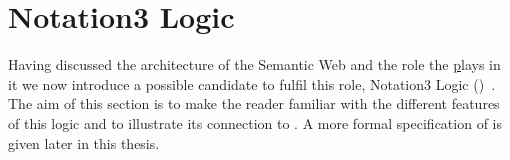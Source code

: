 % 
% 




\section{Notation3 Logic}\label{n3examples}
Having discussed the architecture of the Semantic Web and the role the \ul plays in it we now introduce a possible candidate to fulfil this role, 
Notation3 Logic (\nthreelogic)~\cite{N3Logic}. 
The aim of this section is to make the reader familiar with
the different features of this logic and to illustrate its connection to \rdf. %
A more formal specification of \nthreelogic is given later in this thesis.


